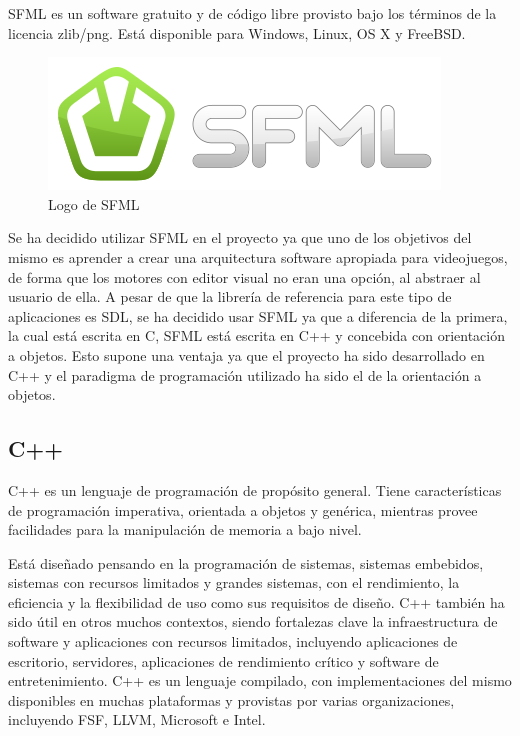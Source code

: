 		SFML es un software gratuito y de código libre provisto bajo los términos de la licencia zlib/png. Está disponible para Windows, Linux, OS X y FreeBSD.

		\begin{figure}[!htp]
			 \centering
			 \includegraphics{fig/sfml}
			 \caption{Logo de SFML}
			 \label{fig:sfml}
		\end{figure}

		Se ha decidido utilizar SFML en el proyecto ya que uno de los objetivos del mismo es aprender a crear una arquitectura software apropiada para videojuegos, de forma que los motores con editor visual no eran una opción, al abstraer al usuario de ella. A pesar de que la librería de referencia para este tipo de aplicaciones es SDL, se ha decidido usar SFML ya que a diferencia de la primera, la cual está escrita en C, SFML está escrita en C++ y concebida con orientación a objetos. Esto supone una ventaja ya que el proyecto ha sido desarrollado en C++ y el paradigma de programación utilizado ha sido el de la orientación a objetos.

	\subsection{C++}

		C++ es un lenguaje de programación de propósito general. Tiene características de programación imperativa, orientada a objetos y genérica, mientras provee facilidades para la manipulación de memoria a bajo nivel.

		Está diseñado pensando en la programación de sistemas, sistemas embebidos, sistemas con recursos limitados y grandes sistemas, con el rendimiento, la eficiencia y la flexibilidad de uso como sus requisitos de diseño. C++ también ha sido útil en otros muchos contextos, siendo fortalezas clave la infraestructura de software y aplicaciones con recursos limitados, incluyendo aplicaciones de escritorio, servidores, aplicaciones de rendimiento crítico y software de entretenimiento. C++ es un lenguaje compilado, con implementaciones del mismo disponibles en muchas plataformas y provistas por varias organizaciones, incluyendo FSF, LLVM, Microsoft e Intel.

